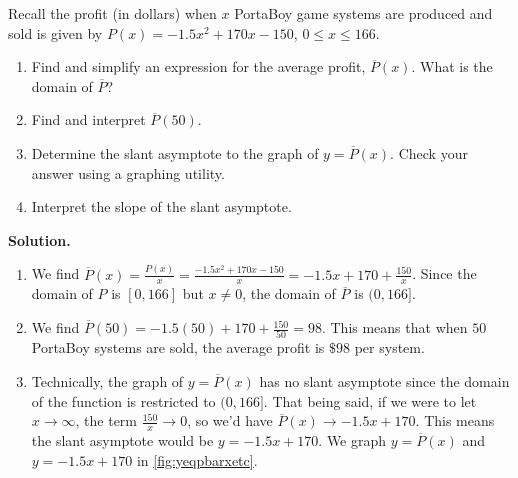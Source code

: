 \begin{ex} \label{PortaBoyAverageProfit}  Recall the profit (in dollars) when $x$ PortaBoy game systems are produced and sold is given by $P(x) =  -1.5x^2+170x-150$, $0 \leq x \leq 166$.

\begin{enumerate}

\item  Find and simplify an expression for the average profit, $\overline{P}(x)$.  What is the domain of $\overline{P}$?

\item Find and interpret $\overline{P}(50)$.

\item Determine the slant asymptote to the graph of $y = \overline{P}(x)$.  Check your answer using a graphing utility.

\item  Interpret the slope of the slant asymptote.


\end{enumerate}

{\bf Solution.}

\begin{enumerate}

\item  We find $\overline{P}(x)  = \frac{P(x)}{x} = \frac{ -1.5x^2+170x-150}{x} = -1.5x + 170 + \frac{150}{x}$.  Since the domain of $P$ is $[0, 166]$ but $x \neq 0$, the domain of $\overline{P}$ is $(0, 166]$.

\item  We find $\overline{P}(50) = -1.5(50)+170 + \frac{150}{50} = 98$.  This means that when $50$ PortaBoy systems are sold, the average profit is $\$ 98$ per system.

\item  Technically, the graph of $y = \overline{P}(x)$ has no slant asymptote since the domain of the function is restricted to $(0, 166]$.  That being said, if we were to let $x \rightarrow \infty$, the term $\frac{150}{x} \rightarrow 0$, so we'd  have $\overline{P}(x)  \rightarrow -1.5x + 170$.  This means the slant asymptote would be $y = -1.5x + 170$.  We graph $y = \overline{P}(x)$ and $y = -1.5x+170$ in \autoref{fig:yeqpbarxetc}.

\begin{mfigure}
   

\caption{}
\label{fig:yeqpbarxetc}
\end{mfigure}


\end{enumerate}
\end{ex}
